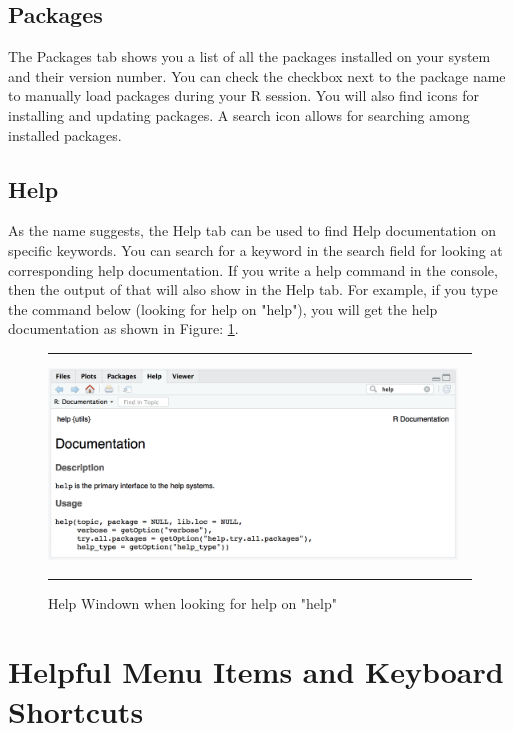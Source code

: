 \documentclass[10pt, letterpaper, twoside]{memoir}\usepackage{knitr}
\begin{document}
\subsection{Packages}

The Packages tab shows you a list of all the packages installed on your system and their version number. You can check the checkbox next to the package name to manually load packages during your R session. You will also find icons for installing and updating packages. A search icon allows for searching among installed packages. 

\subsection{Help}

As the name suggests, the Help tab can be used to find Help documentation on specific keywords. You can search for a keyword in the search field for looking at corresponding help documentation. If you write a help command in the console, then the output of that will also show in the Help tab. For example, if you type the command below (looking for help on "help"), you will get the help documentation as shown in Figure: \ref{fig:help}.

\begin{knitrout}
\color{fgcolor}\begin{kframe}
\begin{alltt}
\hlstd{(}\hlstd{)}
\end{alltt}
\end{kframe}
\end{knitrout}

\begin{figure}
\rule{4in}{1pt}
\centering
\includegraphics[height=2in]{images/help.png}
\caption{Help Windown when looking for help on "help"}
\label{fig:help}
\rule{4in}{1pt}
\end{figure}

\section{Helpful Menu Items and Keyboard Shortcuts}
\end{document}
